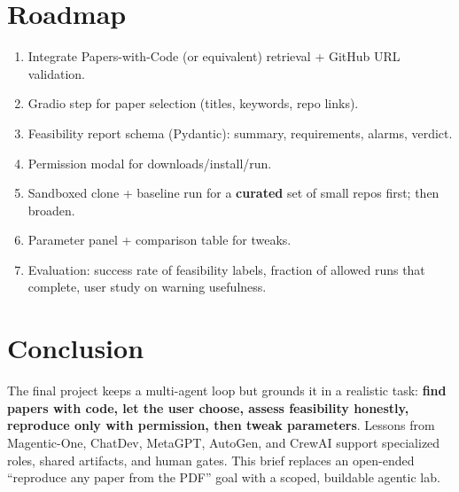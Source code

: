 \documentclass[11pt,a4paper]{article}
\begin{document}
\section{Roadmap}
\label{sec:roadmap}

\begin{enumerate}[leftmargin=*]
  \item Integrate Papers-with-Code (or equivalent) retrieval + GitHub URL
        validation.
  \item Gradio step for paper selection (titles, keywords, repo links).
  \item Feasibility report schema (Pydantic): summary, requirements,
        alarms, verdict.
  \item Permission modal for downloads/install/run.
  \item Sandboxed clone + baseline run for a \textbf{curated} set of small
        repos first; then broaden.
  \item Parameter panel + comparison table for tweaks.
  \item Evaluation: success rate of feasibility labels, fraction of allowed
        runs that complete, user study on warning usefulness.
\end{enumerate}

\section{Conclusion}

The final project keeps a multi-agent loop but grounds it in a realistic
task: \textbf{find papers with code, let the user choose, assess
feasibility honestly, reproduce only with permission, then tweak
parameters}. Lessons from Magentic-One, ChatDev, MetaGPT, AutoGen, and
CrewAI support specialized roles, shared artifacts, and human gates. This
brief replaces an open-ended ``reproduce any paper from the PDF'' goal with
a scoped, buildable agentic lab.
\end{document}
